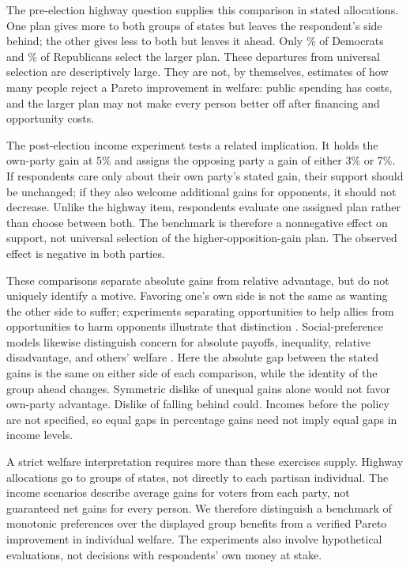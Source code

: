 \documentclass[11pt]{article}
\begin{document}
The pre-election highway question supplies this comparison in stated allocations. One plan gives more to both groups of states but leaves the respondent's side behind; the other gives less to both but leaves it ahead. Only \HighwayDemLarger{}\% of Democrats and \HighwayRepLarger{}\% of Republicans select the larger plan. These departures from universal selection are descriptively large. They are not, by themselves, estimates of how many people reject a Pareto improvement in welfare: public spending has costs, and the larger plan may not make every person better off after financing and opportunity costs.

The post-election income experiment tests a related implication. It holds the own-party gain at 5\% and assigns the opposing party a gain of either 3\% or 7\%. If respondents care only about their own party's stated gain, their support should be unchanged; if they also welcome additional gains for opponents, it should not decrease. Unlike the highway item, respondents evaluate one assigned plan rather than choose between both. The benchmark is therefore a nonnegative effect on support, not universal selection of the higher-opposition-gain plan. The observed effect is negative in both parties.

These comparisons separate absolute gains from relative advantage, but do not uniquely identify a motive. Favoring one's own side is not the same as wanting the other side to suffer; experiments separating opportunities to help allies from opportunities to harm opponents illustrate that distinction \citep{amira2021}. Social-preference models likewise distinguish concern for absolute payoffs, inequality, relative disadvantage, and others' welfare \citep{fehr1999,charness2002}. Here the absolute gap between the stated gains is the same on either side of each comparison, while the identity of the group ahead changes. Symmetric dislike of unequal gains alone would not favor own-party advantage. Dislike of falling behind could. Incomes before the policy are not specified, so equal gaps in percentage gains need not imply equal gaps in income levels.

A strict welfare interpretation requires more than these exercises supply. Highway allocations go to groups of states, not directly to each partisan individual. The income scenarios describe average gains for voters from each party, not guaranteed net gains for every person. We therefore distinguish a benchmark of monotonic preferences over the displayed group benefits from a verified Pareto improvement in individual welfare. The experiments also involve hypothetical evaluations, not decisions with respondents' own money at stake.
\end{document}
